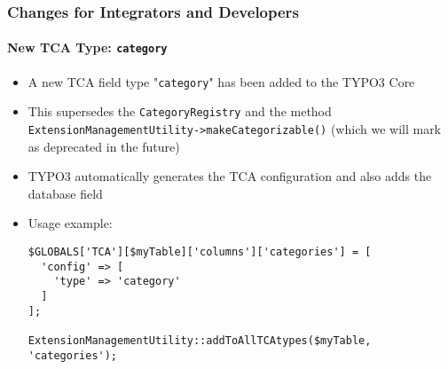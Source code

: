 %

\begin{frame}[fragile]
	\frametitle{Changes for Integrators and Developers}
	\framesubtitle{New TCA Type: \texttt{category}}


	\begin{itemize}
		\item A new TCA field type "\texttt{category}" has been added to the TYPO3 Core
		\item This supersedes the \texttt{CategoryRegistry} and the method\newline
			\small
				\texttt{ExtensionManagementUtility->makeCategorizable()}\newline
				(which we will mark as deprecated in the future)
			\normalsize
		\item TYPO3 automatically generates the TCA configuration and also adds
			the database field
		\item Usage example:
\begin{lstlisting}
$GLOBALS['TCA'][$myTable]['columns']['categories'] = [
  'config' => [
    'type' => 'category'
  ]
];

ExtensionManagementUtility::addToAllTCAtypes($myTable, 'categories');
\end{lstlisting}

	\end{itemize}

\end{frame}


